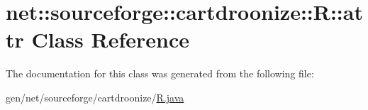 \hypertarget{classnet_1_1sourceforge_1_1cartdroonize_1_1R_1_1attr}{
\section{net::sourceforge::cartdroonize::R::attr Class Reference}
\label{classnet_1_1sourceforge_1_1cartdroonize_1_1R_1_1attr}
}


The documentation for this class was generated from the following file:\begin{DoxyCompactItemize}
\item 
gen/net/sourceforge/cartdroonize/\hyperlink{R_8java}{R.java}\end{DoxyCompactItemize}
